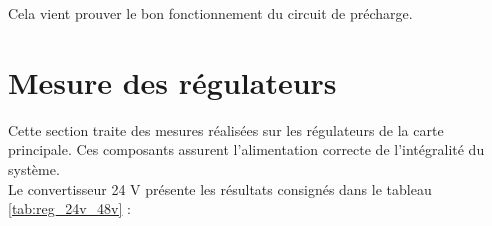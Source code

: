 Cela vient prouver le bon fonctionnement du circuit de précharge.

\section{Mesure des régulateurs}

Cette section traite des mesures réalisées sur les régulateurs de la carte principale. Ces composants assurent l'alimentation correcte de l'intégralité du système.\\

Le convertisseur 24 V présente les résultats consignés dans le tableau \ref{tab:reg_24v_48v} :

\begin{table}[H]
    \centering
    \caption{Mesures sur les régulateurs 24V et l'entrée 48V (PS1)}
    \label{tab:reg_24v_48v}
\end{table}

